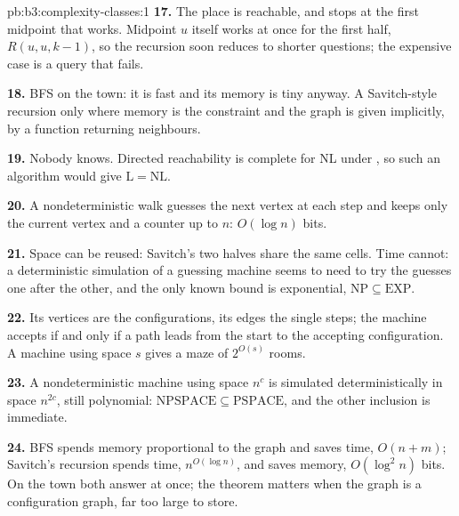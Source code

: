 \begin{solution}{pb:b3:complexity-classes:1}
\textbf{17.} The place is reachable, and  stops at the first midpoint that works. Midpoint $u$ itself works at once for the first half, $R(u, u, k - 1)$, so the recursion soon reduces to shorter questions; the expensive case is a query that fails.

\textbf{18.} BFS on the town: it is fast and its memory is tiny anyway. A Savitch-style recursion only where memory is the constraint and the graph is given implicitly, by a function returning neighbours.

\textbf{19.} Nobody knows. Directed reachability is complete for NL under , so such an algorithm would give $\mathrm{L} = \mathrm{NL}$.

\textbf{20.} A nondeterministic walk guesses the next vertex at each step and keeps only the current vertex and a counter up to $n$: $O(\log n)$ bits.

\textbf{21.} Space can be reused: Savitch's two halves share the same cells. Time cannot: a deterministic simulation of a guessing machine seems to need to try the guesses one after the other, and the only known bound is exponential, $\mathrm{NP} \subseteq \mathrm{EXP}$.

\textbf{22.} Its vertices are the configurations, its edges the single steps; the machine accepts if and only if a path leads from the start to the accepting configuration. A machine using space $s$ gives a maze of $2^{O(s)}$ rooms.

\textbf{23.} A nondeterministic machine using space $n^c$ is simulated deterministically in space $n^{2c}$, still polynomial: $\mathrm{NPSPACE} \subseteq \mathrm{PSPACE}$, and the other inclusion is immediate.

\textbf{24.} BFS spends memory proportional to the graph and saves time, $O(n + m)$; Savitch's recursion spends time, $n^{O(\log n)}$, and saves memory, $O(\log^2 n)$ bits. On the town both answer at once; the theorem matters when the graph is a configuration graph, far too large to store.
\end{solution}
